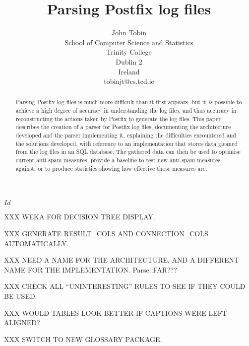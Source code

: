 \documentclass[a4paper,12pt,draft]{article}
\newcounter{dummy}
\begin{document}




\title{Parsing Postfix log files}
\author{John Tobin \\ School of Computer Science and Statistics \\
Trinity College \\ Dublin 2 \\ Ireland \\ tobinjt@cs.tcd.ie}
\maketitle
\SVN$Id$
\begin{center}\SVNId{}\end{center}

\begin{abstract}

    Parsing Postfix log files is much more difficult than it first appears,
    but it \textit{is\/} possible to achieve a high degree of accuracy in
    understanding the log files, and thus accuracy in reconstructing the
    actions taken by Postfix to generate the log files.  This paper
    describes the creation of a parser for Postfix log files, documenting
    the architecture developed and the parser implementing it, explaining
    the difficulties encountered and the solutions developed, with
    reference to an implementation that stores data gleaned from the log
    files in an SQL database.  The gathered data can then be used to
    optimise current anti-spam measures, provide a baseline to test new
    anti-spam measures against, or to produce statistics showing how
    effective those measures are.

\end{abstract}

XXX WEKA FOR DECISION TREE DISPLAY\@.

XXX GENERATE RESULT\_COLS AND CONNECTION\_COLS AUTOMATICALLY\@.

XXX NEED A NAME FOR THE ARCHITECTURE, AND A DIFFERENT NAME FOR THE
IMPLEMENTATION\@.  Parse::FAR\@???

XXX CHECK ALL ``UNINTERESTING'' RULES TO SEE IF THEY COULD BE USED\@.

XXX WOULD TABLES LOOK BETTER IF CAPTIONS WERE LEFT-ALIGNED\@?

XXX SWITCH TO NEW GLOSSARY PACKAGE\@.
\end{document}
